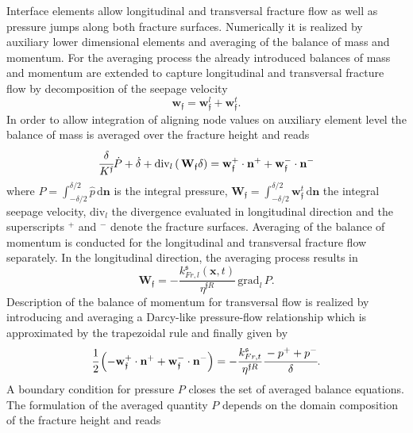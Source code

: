 Interface elements allow longitudinal and transversal fracture flow as well as pressure jumps along both fracture surfaces. Numerically it is realized by auxiliary lower dimensional elements and averaging of the balance of mass and momentum. For the averaging process the already introduced balances of mass and momentum are extended to capture longitudinal and transversal fracture flow by decomposition of the seepage velocity 
\begin{equation}
    \label{eq:seepage_decomp}
    \mathbf{w}_\mathfrak{f} = \mathbf{w}_\mathfrak{f}^l + \mathbf{w}_\mathfrak{f}^t.
\end{equation}
In order to allow integration of aligning node values on auxiliary element level the balance of mass is averaged over the fracture height and reads
\begin{equation}
    \label{eq:avg_mass_integral_final}
    \cfrac{\delta}{K^\mathfrak{f}}\dot{P} + \dot{\delta} + \text{div}_l
\left(\, \mathbf{W}_\mathfrak{f} \delta \right) = \mathbf{w}^+_\mathfrak{f} \cdot \mathbf{n^+} + \mathbf{w}^-_\mathfrak{f} \cdot \mathbf{n}^-
\end{equation}
where $P = \int_{-\delta/2}^{\delta/2}  \hat{p} \, \text{d}\mathbf{n}$ is the integral pressure, $\mathbf{W}_\mathfrak{f} = \int_{-\delta/2}^{\delta/2} \mathbf{w}^t_\mathfrak{f} \, \text{d}\mathbf{n}$ the integral seepage velocity, $\text{div}_l$ the divergence evaluated in longitudinal direction and the superscripts $^+$ and $^-$ denote the fracture surfaces. Averaging of the balance of momentum is conducted for the longitudinal and transversal fracture flow separately. In the longitudinal direction, the averaging process results in
\begin{equation}
    \label{eq:avg_longitudinal}
    \mathbf{W}_\mathfrak{f} = -\frac{ k^\mathfrak{s}_{Fr,l}(\mathbf{x},t)}{\eta^{\mathfrak{f}R}} \, \text{grad}_l \, P.
\end{equation}
Description of the balance of momentum for transversal flow is realized by introducing and averaging a Darcy-like pressure-flow relationship which is approximated by the trapezoidal rule and finally given by 
\begin{equation}
   \label{eq:transversal_final}
   \cfrac{1}{2} \left(-\mathbf{w}^+_\mathfrak{f} \cdot \mathbf{n}^+ + \mathbf{w}^-_\mathfrak{f} \cdot \mathbf{n}^- \right) = - \frac{k^\mathfrak{s}_{Fr,t}}{\eta^{\mathfrak{f}R}}\cfrac{-p^+ + p^-}{\delta}.
\end{equation}
A boundary condition for pressure $P$ closes the set of averaged balance equations. The formulation of the averaged quantity $P$ depends on the domain composition of the fracture height and reads
